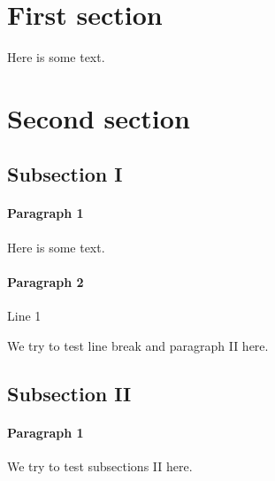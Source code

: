 \documentclass{mockDoc}
\begin{document}
\section{First section}
Here is some text.
\section{Second section}
\subsection{Subsection I}
\paragraph{Paragraph 1}
Here is some text.
\paragraph{Paragraph 2}
Line 1

We try to test line break and paragraph II here.
\subsection{Subsection II}
\paragraph{Paragraph 1}
We try to test subsections II here.
\end{document}
